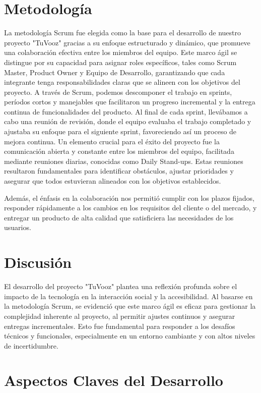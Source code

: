\documentclass[12pt, a4paper, twocolumn]{article}
\begin{document}
\section{Metodología}
La metodología Scrum fue elegida como la base para el desarrollo de nuestro proyecto "TuVooz" gracias a su enfoque estructurado y dinámico, que promueve una colaboración efectiva entre los miembros del equipo. Este marco ágil se distingue por su capacidad para asignar roles específicos, tales como Scrum Master, Product Owner y Equipo de Desarrollo, garantizando que cada integrante tenga responsabilidades claras que se alineen con los objetivos del proyecto.
A través de Scrum, podemos descomponer el trabajo en sprints, períodos cortos y manejables que facilitaron un progreso incremental y la entrega continua de funcionalidades del producto. Al final de cada sprint, llevábamos a cabo una reunión de revisión, donde el equipo evaluaba el trabajo completado y ajustaba su enfoque para el siguiente sprint, favoreciendo así un proceso de mejora continua.
Un elemento crucial para el éxito del proyecto fue la comunicación abierta y constante entre los miembros del equipo, facilitada mediante reuniones diarias, conocidas como Daily Stand-ups. Estas reuniones resultaron fundamentales para identificar obstáculos, ajustar prioridades y asegurar que todos estuvieran alineados con los objetivos establecidos.

Además, el énfasis en la colaboración nos permitió cumplir con los plazos fijados, responder rápidamente a los cambios en los requisitos del cliente o del mercado, y entregar un producto de alta calidad que satisficiera las necesidades de los usuarios.


\section{Discusión}
El desarrollo del proyecto "TuVooz" plantea una reflexión profunda sobre el impacto de la tecnología en la interacción social y la accesibilidad. Al basarse en la metodología Scrum, se evidenció que este marco ágil es eficaz para gestionar la complejidad inherente al proyecto, al permitir ajustes continuos y asegurar entregas incrementales. Esto fue fundamental para responder a los desafíos técnicos y funcionales, especialmente en un entorno cambiante y con altos niveles de incertidumbre.

\section*{Aspectos Claves del Desarrollo}
\end{document}
